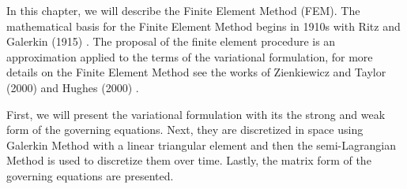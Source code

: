 In this chapter, we will describe the Finite Element Method (FEM). 
The mathematical basis for the Finite Element Method begins in 1910s
 with Ritz \cite{ritz1909} and Galerkin (1915) \cite{galerkin1915}.
The proposal of the finite element procedure is 
an approximation applied to the terms of the 
variational formulation, 
for more details on the Finite Element Method see the works of 
Zienkiewicz and Taylor (2000) \cite{zienkiewiczvol3} and
Hughes (2000) \cite{hughes2000}.
\par

First, we will present the variational formulation with its
the strong and weak form of the
governing equations. 
Next, they are discretized in space using Galerkin Method 
with a linear triangular element and then
the semi-Lagrangian Method is used to discretize
them over time.
Lastly, the matrix form
of the governing equations are presented.
